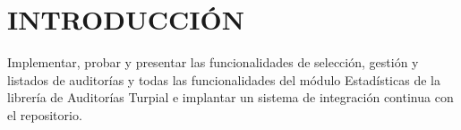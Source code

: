 \chapter*{\textbf{INTRODUCCIÓN}}


Implementar, probar y presentar las funcionalidades de selección, gestión y listados de auditorías y todas las funcionalidades del módulo Estadísticas de la librería de Auditorías Turpial e implantar un sistema de integración continua con el repositorio.  
 

